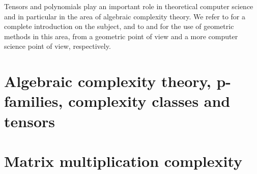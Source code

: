 Tensors and polynomials play an important role in theoretical computer science and in particular in the area of algebraic complexity theory. We refer to \cite{BCS97} for a complete introduction on the subject, and to \cite{Lan17} and \cite{BI18} for the use of geometric methods in this area, from a geometric point of view and a more computer science point of view, respectively.


\chapter{Algebraic complexity theory, p-families, complexity classes and tensors}
\label{complexitytheory-chapter-ACTintro}


\chapter{Matrix multiplication complexity}
\label{complexitytheory-chapter-MatrixMultiplication}


